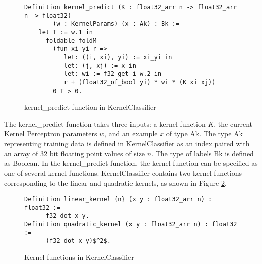 \begin{figure}
    \caption{kernel\_predict function in KernelClassifier}
    \label{kernel_predictDef}
    \begin{lstlisting}
Definition kernel_predict (K : float32_arr n -> float32_arr n -> float32) 
        (w : KernelParams) (x : Ak) : Bk :=
    let T := w.1 in 
      foldable_foldM
        (fun xi_yi r =>
           let: ((i, xi), yi) := xi_yi in
           let: (j, xj) := x in 
           let: wi := f32_get i w.2 in 
           r + (float32_of_bool yi) * wi * (K xi xj))
        0 T > 0.
    \end{lstlisting}
\end{figure}

The kernel\_predict function takes three inputs: a kernel function $K$, the current Kernel Perceptron parameters $w$, and an example $x$ of type Ak. The type Ak representing training data is defined in KernelClassifier as an index paired with an array of 32 bit floating point values of size $n$. The type of labels Bk is defined as Boolean. In the kernel\_predict function, the kernel function can be specified as one of several kernel functions. KernelClassifier contains two kernel functions corresponding to the linear and quadratic kernels, as shown in Figure \ref{kernelfunctionsDef}.

\begin{figure}
    \caption{Kernel functions in KernelClassifier}
    \label{kernelfunctionsDef}
    \begin{lstlisting}[mathescape]
Definition linear_kernel {n} (x y : float32_arr n) : float32 :=
      f32_dot x y.
Definition quadratic_kernel (x y : float32_arr n) : float32 :=
      (f32_dot x y)$^2$.
    \end{lstlisting}
\end{figure}

